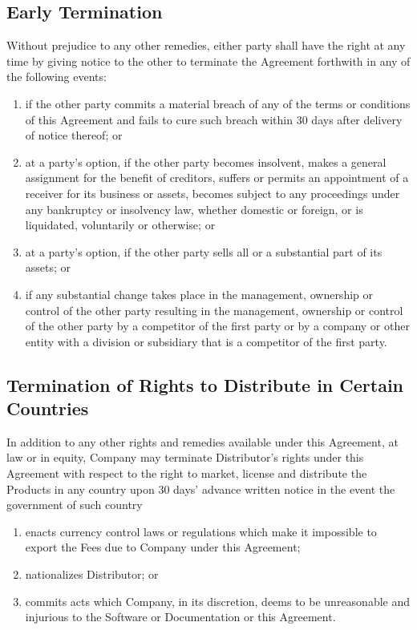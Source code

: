 \documentclass[letterpaper,10pt,openany,oneside,english]{sphinxmanual}
\begin{document}
\subsection{Early Termination}
\label{\detokenize{terminiation:early-termination}}
Without prejudice to any other remedies, either party shall have the right at any time by giving notice to the other to terminate the Agreement forthwith in any of the following events:
\begin{enumerate}
\item {} 
if the other party commits a material breach of any of the terms or conditions of this Agreement and fails to cure such breach within 30 days after delivery of notice thereof; or

\item {} 
at a party’s option, if the other party becomes insolvent, makes a general assignment for the benefit of creditors, suffers or permits an appointment of a receiver for its business or assets, becomes subject to any proceedings under any bankruptcy or insolvency law, whether domestic or foreign, or is liquidated, voluntarily or otherwise; or

\item {} 
at a party’s option, if the other party sells all or a substantial part of its assets; or

\item {} 
if any substantial change takes place in the management, ownership or control of the other party resulting in the management, ownership or control of the other party by a competitor of the first party or by a company or other entity with a division or subsidiary that is a competitor of the first party.

\end{enumerate}


\subsection{Termination of Rights to Distribute in Certain Countries}
\label{\detokenize{terminiation:termination-of-rights-to-distribute-in-certain-countries}}
In addition to any other rights and remedies available under this Agreement, at law or in equity, Company may terminate Distributor’s rights under this Agreement with respect to the right to market, license and distribute the Products in any country upon 30 days’ advance written notice in the event the government of such country
\begin{enumerate}
\item {} 
enacts currency control laws or regulations which make it impossible to export the Fees due to Company under this Agreement;

\item {} 
nationalizes Distributor; or

\item {} 
commits acts which Company, in its discretion, deems to be unreasonable and injurious to the Software or Documentation or this Agreement.

\end{enumerate}
\end{document}
